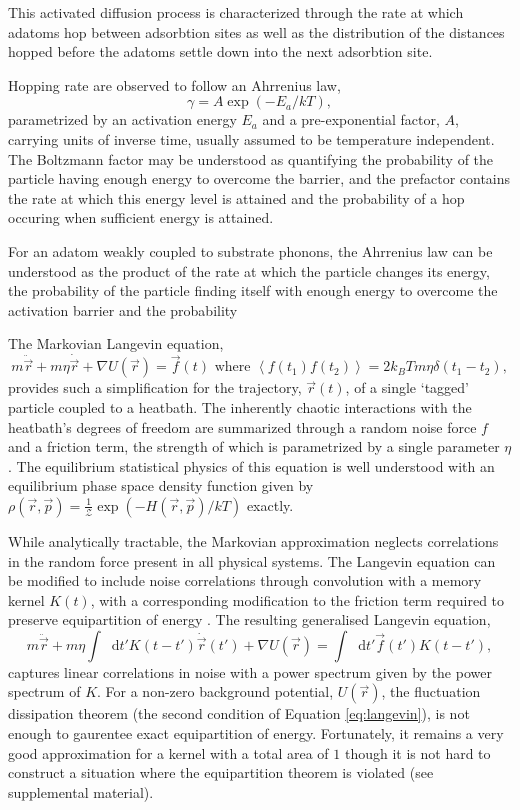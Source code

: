 \documentclass[7pt]{article}
\newcommand*{\diff}{\mathop{}\!\mathrm{d}}
\begin{document}
This activated diffusion process is characterized through the rate at which adatoms hop between adsorbtion sites as well as the distribution of the distances hopped before the adatoms settle down into the next adsorbtion site. 

Hopping rate are observed to follow an Ahrrenius law\cite{someone}, $$\gamma=A\exp(-E_a/kT),$$ parametrized by an activation energy $E_a$ and a pre-exponential factor, $A$, carrying units of inverse time, usually assumed to be temperature independent. The Boltzmann factor may be understood as quantifying the probability of the particle having enough energy to overcome the barrier, and the prefactor contains the rate at which this energy level is attained and the probability of a hop occuring when sufficient energy is attained.



For an adatom weakly coupled to substrate phonons, the Ahrrenius law can be understood as the product of the rate at which the particle changes its energy, the probability of the particle finding itself with enough energy to overcome the activation barrier and the probability  

The Markovian Langevin equation, 
\begin{equation}
	m\ddot{\vec{r}}+m\eta\dot{\vec{r}}+\nabla U(\vec{r})=\vec{f}(t) \text{ where } \left<f(t_1)f(t_2)\right>=2k_BTm\eta\delta(t_1-t_2),
	\label{eq:langevin}
\end{equation}
provides such a simplification for the trajectory, $\vec{r}(t)$, of a single `tagged' particle coupled to a heatbath\cite{Kramers}. The inherently chaotic interactions with the heatbath's degrees of freedom are summarized through a random noise force $f$ and a friction term, the strength of which is parametrized by a single parameter $\eta$. The equilibrium statistical physics of this equation is well understood with an equilibrium phase space density function given by $\rho(\vec{r}, \vec{p})=\frac{1}{\mathcal{Z}}\exp\left(-H(\vec{r}, \vec{p})/kT\right)$ exactly\cite{Zwanzig}.

While analytically tractable, the Markovian approximation neglects correlations in the random force present in all physical systems. The Langevin equation can be modified to include noise correlations through convolution with a memory kernel $K(t)$, with a corresponding modification to the friction term required to preserve equipartition of energy \cite{Kubo}. The resulting generalised Langevin equation, 
\begin{equation}
	m\ddot{\vec{r}}+m\eta\int\diff{t'}K(t-t')\dot{\vec{r}}(t')+\nabla U(\vec{r})=\int\diff{t'}\vec{f}(t')K(t-t'),
	\label{eq:gle}
\end{equation}
captures linear correlations in noise with a power spectrum given by the power spectrum of $K$. For a non-zero background potential, $U(\vec{r})$, the fluctuation dissipation theorem (the second condition of Equation \ref{eq:langevin}), is not enough to gaurentee exact equipartition of energy. Fortunately, it remains a very good approximation for a kernel with a total area of $1$ though it is not hard to construct a situation where the equipartition theorem is violated (see supplemental material). 
\end{document}
